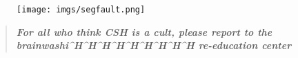 \documentclass[9pt]{extarticle} %
\begin{document}

\pagestyle{fancy}
\fancyhf{}
\rhead{\today}
\addtolength\footskip{-15px}




\begin{figure}[H]
\centering\vspace{0.5cm}\texttt{[image: imgs/segfault.png]}
\end{figure}


\vspace{-15px}
\begin{quote}
\centering
\textbf{\textit{For all who think CSH is a cult, please report to the 
brainwashi\^{}H\^{}H\^{}H\^{}H\^{}H\^{}H\^{}H\^{}H\^{}H re-education center}}
\end{quote}
\vspace{10px}

\end{document}
